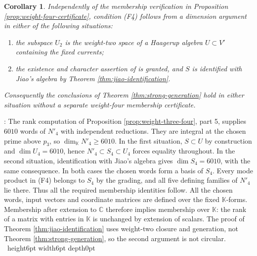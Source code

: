 \documentclass[leqno]{article}
\newcommand{\Cbb}{\ensuremath{\mathbb{C}}}
\newcommand{\K}{\ensuremath{\mathbb{K}}}
\renewcommand{\geq}{\ensuremath{\geqslant}}
\newcommand{\qed}{\hfill \vrule height6pt  width6pt depth0pt}
\newtheorem{cor}[thm]{Corollary}
\newenvironment{proof}[1][]{\noindent {\it Proof #1} : }{\hbox{~}\qed
\smallskip
}
\numberwithin{equation}{section}
\begin{document}
\begin{cor}
\label{cor:weight-four-from-haagerup}
Independently of the membership verification in Proposition \ref{prop:weight-four-certificate}, condition \textup{(F4)} follows from a dimension argument in either of the following situations:
\begin{enumerate}
\item the subspace $U_2$ is the weight-two space of a Haagerup algebra $U \subset V'$ containing the fixed currents;
\item the existence and character assertion of \cite{Jia26} is granted, and $S$ is identified with Jiao's algebra by Theorem \ref{thm:jiao-identification}.
\end{enumerate}
Consequently the conclusions of Theorem \ref{thm:strong-generation} hold in either situation without a separate weight-four membership certificate.
\end{cor}

\begin{proof}
The rank computation of Proposition \ref{prop:weight-three-four}, part 5, supplies $6010$ words of $N'_4$ with independent reductions. They are integral at the chosen prime above $p_3$, so $\dim_{\K}N'_4 \geq 6010$. In the first situation, $S \subset U$ by construction and $\dim U_4 = 6010$, hence $N'_4 \subset S_4 \subset U_4$ forces equality throughout. In the second situation, identification with Jiao's algebra gives $\dim S_4 = 6010$, with the same consequence. In both cases the chosen words form a basis of $S_4$. Every mode product in \textup{(F4)} belongs to $S_4$ by the grading, and all five defining families of $N'_4$ lie there. Thus all the required membership identities follow. All the chosen words, input vectors and coordinate matrices are defined over the fixed $\K$-forms. Membership after extension to $\Cbb$ therefore implies membership over $\K$: the rank of a matrix with entries in $\K$ is unchanged by extension of scalars. The proof of Theorem \ref{thm:jiao-identification} uses weight-two closure and generation, not Theorem \ref{thm:strong-generation}, so the second argument is not circular.
\end{proof}
\end{document}
